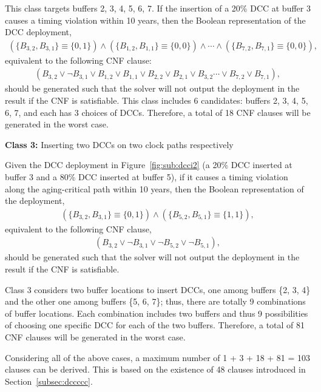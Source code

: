 This class targets buffers 2, 3, 4, 5, 6, 7. If the insertion of a 20\% DCC at buffer 3 causes a timing violation within 10 years, then the Boolean representation of the DCC deployment, 
{\fontsize{9}{10}
\begin{gather*}
	\left(\{B_{3,2}, B_{3,1}\} \equiv \{0, 1\} \right) \land \left( \{B_{1,2}, B_{1,1}\} \equiv \{0, 0\} \right) \land \dotsb 
	\land \left( \{B_{7,2}, B_{7,1}\} \equiv \{0, 0\} \right),
\end{gather*}}equivalent to the following CNF clause:
{\fontsize{9}{10}
\begin{gather*}
	(B_{3,2} \lor \neg B_{3,1} \lor B_{1,2} \lor B_{1,1} \lor B_{2,2} \lor B_{2,1} \lor B_{3,2} \dotsb  
\lor B_{7,2} \lor B_{7,1}),
\end{gather*}}should be generated such that the solver will not output the deployment in the result if the CNF is satisfiable. This class includes 6 candidates: buffers 2, 3, 4, 5, 6, 7, and each has 3 choices of DCCs. Therefore, a total of 18 CNF clauses will be generated in the worst case.


\noindent \textbf{Class 3:} Inserting two DCCs on two clock paths respectively

Given the DCC deployment in Figure~\ref{fig:sub:dcci2} (a 20\% DCC inserted at buffer 3 and a 80\% DCC inserted at buffer 5), if it causes a timing violation along the aging-critical path within 10 years, then the Boolean representation of the deployment,
{\fontsize{9}{10}
\begin{gather*}
\left(\{B_{3,2}, B_{3,1}\} \equiv \{0, 1\} \right) \land \left( \{B_{5,2}, B_{5,1}\} \equiv \{1, 1\} \right),
\end{gather*}}equivalent to the following CNF clause,
{\fontsize{9}{10}
\begin{gather*}
\left(B_{3,2} \lor \neg B_{3,1} \lor \neg B_{5,2} \lor \neg B_{5,1} \right), 
\end{gather*}}should be generated such that the solver will not output the deployment in the result if the CNF is satisfiable.

Class 3 considers two buffer locations to insert DCCs, one among buffers \{2, 3, 4\} and the other one among buffers \{5, 6, 7\}; thus, there are totally 9 combinations of buffer locations. Each combination includes two buffers and thus 9 possibilities of choosing one specific DCC for each of the two buffers. Therefore, a total of 81 CNF clauses will be generated in the worst case.

Considering all of the above cases, a maximum number of 1 + 3 + 18 + 81 = 103 clauses can be derived. This is based on the existence of 48 clauses introduced in Section~\ref{subsec:dccccc}.


